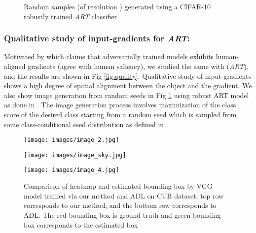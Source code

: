 \documentclass[runningheads]{llncs}
\begin{document}
\begin{figure}[t]
\centering
{}
\caption{\footnotesize{Random samples (of resolution ) generated using a CIFAR-10 robustly trained \textit{ART} classifier}}
\label{fig:img_gen}
\end{figure}


\subsubsection{Qualitative study of input-gradients for \textit{ART}:}
Motivated by \cite{odds_madry} which claims that adversarially trained models exhibits human-aligned gradients (agree with human saliency), we studied the same with (\textit{ART}), and the results are shown in Fig \ref{fig:quality}. Qualitative study of input-gradients shows a high degree of spatial alignment between the object and the gradient. We also show image generation from random seeds in Fig \ref{fig:img_gen} using robust ART model as done in \cite{santurkar2019synthesis}. The image generation process involves maximization of the class score of the desired class starting from a random seed which is sampled from some class-conditional seed distribution as defined in \cite{santurkar2019synthesis}.


\begin{figure*}[t]
\centering
    \begin{minipage}{.327\textwidth}
      \texttt{[image: images/image\_2.jpg]}
    \end{minipage}
    \begin{minipage}{.327\textwidth}
      \texttt{[image: images/image\_sky.jpg]}
    \end{minipage}
    \begin{minipage}{.327\textwidth}
      \texttt{[image: images/image\_4.jpg]}
    \end{minipage}
    \caption{\footnotesize{Comparison of heatmap and estimated bounding box by VGG model trained via our method and ADL on CUB dataset; top row corresponds to our method, and the bottom row corresponds to ADL. The red bounding box is ground truth and green bounding box corresponds to the estimated box}}
    \label{fig:loc}
\end{figure*}
\end{document}
